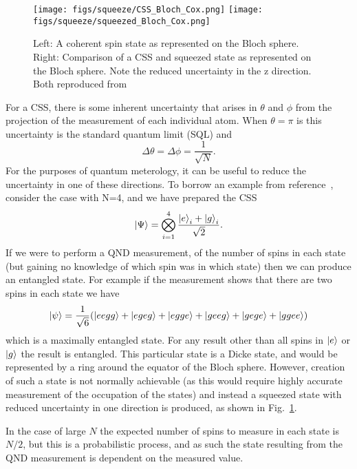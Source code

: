 \documentclass{article}
\begin{document}
\begin{figure}
  \centering
  \texttt{[image: figs/squeeze/CSS\_Bloch\_Cox.png]}
  \texttt{[image: figs/squeeze/squeezed\_Bloch\_Cox.png]}
  \caption{Left: A coherent spin state as represented on the Bloch sphere.
  Right: Comparison of a CSS and squeezed state as represented on the Bloch
  sphere. Note the reduced uncertainty in the z direction.
  Both reproduced from~\cite{Cox2016}}
  \label{CSSbloch}
\end{figure}

For a CSS, there is some inherent uncertainty that arises in $\theta$ and
$\phi$ from the projection of the measurement of each individual atom. When
$\theta=\pi$ is this uncertainty is the standard quantum limit (SQL) and
~\cite{Cox2016}
\begin{equation}
  \Delta \theta = \Delta \phi = \frac{1}{\sqrt{N}}.
\end{equation}
%
For the purposes of quantum meterology, it can be useful to reduce the
uncertainty in one of these directions. To borrow an example from
reference~\cite{Cox2016}, consider the case with N=4, and we have prepared the
CSS
%
\begin{equation}
  \ket{\Psi} = \bigotimes_{i=1}^4 \frac{\ket{e}_i + \ket{g}_i}{\sqrt{2}}.
\end{equation}
%
If we were to perform a QND measurement, of the number of spins in each state
(but gaining no knowledge of which spin was in which state) then we can produce
an entangled state. For example if the measurement shows that there are two
spins in each state we have
%
\begin{equation}
\ket{\psi} = \frac{1}{\sqrt{6}}(\ket{eegg} + \ket{egeg} + \ket{egge} +
\ket{geeg} + \ket{gege} + \ket{ggee})
\end{equation}
which is a maximally entangled state. For any result other than all spins in
$\ket{e}$ or $\ket{g}$ the result is entangled. This particular state is a
Dicke state, and would be represented by a ring around the equator of the Bloch
sphere. However, creation of such a state is not normally achievable (as this
would require highly accurate measurement of the occupation of the states) and
instead a squeezed state with reduced uncertainty in one direction is produced,
as shown in Fig.~\ref{CSSbloch}.


In the case of large $N$ the expected number of spins to measure in each state
is $N/2$, but this is a probabilistic process, and as such the state resulting
from the QND measurement is dependent on the measured value.
\end{document}
